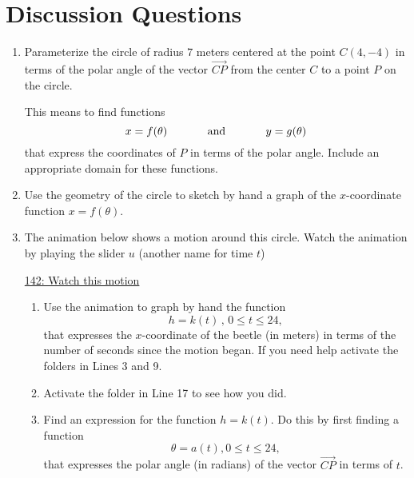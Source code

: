 \documentclass{ximera}
\begin{document}
\section{Discussion Questions}
\begin{question} \label{QLDkfdRE}

\begin{enumerate}

\item Parameterize the circle of radius $7$ meters centered at the point $C(4,-4)$ in terms of the polar angle of the vector $\overrightarrow{CP}$ from the center $C$ to a point $P$ on the circle.

This means to find functions
\[
    x = f(\theta) \hskip 0.5 in \text{and} \hskip 0.5 in y=g(\theta)
\]
that express the coordinates of $P$ in terms of the polar angle. Include an appropriate domain for these functions.

\item Use the geometry of the circle to sketch by hand a graph of the $x$-coordinate function $x=f(\theta)$.

\item The animation below shows a motion around this circle. Watch the animation by playing the slider $u$ (another name for time $t$)

\begin{onlineOnly}
    \begin{center}
\end{center}
\end{onlineOnly}

\href{https://www.desmos.com/calculator/esr4pacqae}{142: Watch this motion}

\begin{enumerate}
\item Use the animation to graph by hand the function
\[
  h = k(t) \, , \, 0\leq t \leq 24,
\]
that expresses the $x$-coordinate of the beetle (in meters) in terms of the number of seconds since the motion began. If you need help activate the folders in Lines 3 and 9.

\item Activate the folder in Line 17 to see how you did.

\item Find an expression for the function $h=k(t)$. Do this by first finding a function 
\[
 \theta = a(t), 0\leq t \leq 24, 
\]
that expresses the polar angle (in radians) of the vector $\overrightarrow{CP}$ in terms of $t$.



\end{enumerate}
\end{enumerate}


\end{question} 
\end{document}
